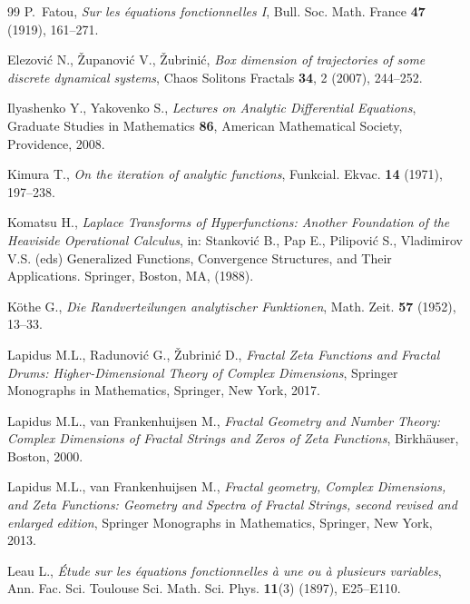 \documentclass[a4paper,11pt]{amsart}
\numberwithin{equation}{section}
\theoremstyle{definition}
\begin{document}
\begin{thebibliography}{99}
	 P.~Fatou, \emph{Sur les équations fonctionnelles I}, Bull. Soc. Math. France \textbf{47} (1919), 161--271.

	 Elezovi\'c N., \v{Z}upanovi\'c V., \v{Z}ubrini\'c, \emph{Box dimension of trajectories of some discrete dynamical systems}, Chaos Solitons Fractals \textbf{34}, 2 (2007), 244--252.

	 Ilyashenko Y., Yakovenko S., \emph{Lectures on Analytic Differential Equations}, Graduate Studies in Mathematics \textbf{86}, American Mathematical Society, Providence, 2008.	

	 Kimura T., \emph{On the iteration of analytic functions}, Funkcial. Ekvac. \textbf{14} (1971), 197--238.
	
	 Komatsu H., \emph{Laplace Transforms of Hyperfunctions: Another Foundation of the Heaviside Operational Calculus}, in: Stanković B., Pap E., Pilipović S., Vladimirov V.S. (eds) Generalized Functions, Convergence Structures, and Their Applications. Springer, Boston, MA, (1988). 
	
	 K\"othe G., \emph{Die Randverteilungen analytischer Funktionen}, Math. Zeit. \textbf{57} (1952), 13–33.

	 Lapidus M.L., Radunovi\'c G., \v{Z}ubrini\'c D., \emph{Fractal Zeta Functions and Fractal Drums:
	Higher-Dimensional Theory of Complex Dimensions}, Springer Monographs in Mathematics, Springer, New York, 2017.
	
	 Lapidus M.L., van Frankenhuijsen M., \emph{Fractal Geometry and Number Theory: Complex
	Dimensions of Fractal Strings and Zeros of Zeta Functions}, Birkh\"auser, Boston, 2000.

	 Lapidus M.L., van Frankenhuijsen M., \emph{Fractal geometry, Complex Dimensions, and Zeta
	Functions: Geometry and Spectra of Fractal Strings, second revised and enlarged edition}, Springer Monographs in Mathematics, Springer, New York, 2013.
		
	 Leau L., \emph{\'{E}tude sur les \'{e}quations fonctionnelles \`a une ou \`a plusieurs
		variables}, Ann. Fac. Sci. Toulouse Sci. Math. Sci. Phys. \textbf{11}(3) (1897), E25--E110.
	

\end{thebibliography}
\end{document}
